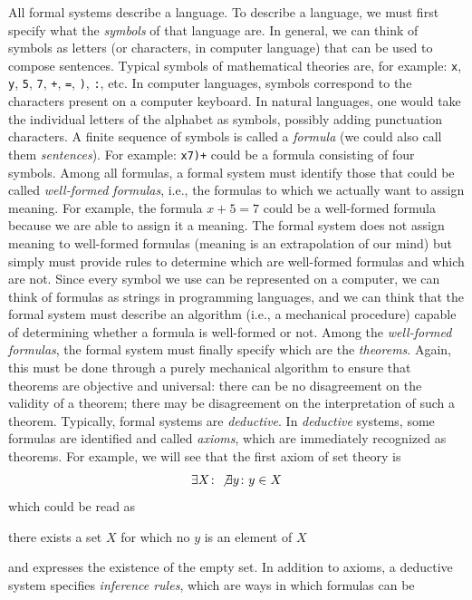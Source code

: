 All formal systems describe a language. To describe a language, we must first
specify what the \emph{symbols}%
%
 of that language are. In general, we can think of symbols as letters (or characters, in computer language) that can be used to compose sentences. Typical symbols of mathematical theories are, for example: \texttt{x}, \texttt{y}, \texttt{5}, \texttt{7}, \texttt{+}, \texttt{=}, \texttt{)}, \texttt{:}, etc. In computer languages, symbols correspond to the characters present on a computer keyboard. In natural languages, one would take the individual letters of the alphabet as symbols, possibly adding punctuation characters. A finite sequence of symbols is called a \emph{formula}%
%
 (we could also call them \emph{sentences}). For example: \texttt{x7)+} could be a formula consisting of four symbols. Among all formulas, a formal system must identify those that could be called \emph{well-formed formulas}, i.e., the formulas to which we actually want to assign meaning. For example, the formula $x+5=7$ could be a well-formed formula because we are able to assign it a meaning. The formal system does not assign meaning to well-formed formulas (meaning is an extrapolation of our mind) but simply must provide rules to determine which are well-formed formulas and which are not. Since every symbol we use can be represented on a computer, we can think of formulas as strings in programming languages, and we can think that the formal system must describe an algorithm (i.e., a mechanical procedure) capable of determining whether a formula is well-formed or not. Among the \emph{well-formed formulas}, the formal system must finally specify which are the \emph{theorems}. Again, this must be done through a purely mechanical algorithm to ensure that theorems are objective and universal: there can be no disagreement on the validity of a theorem; there may be disagreement on the interpretation of such a theorem. Typically, formal systems are \emph{deductive}. In \emph{deductive} systems, some formulas are identified and called \emph{axioms}, which are immediately recognized as theorems. For example, we will see that the first axiom of set theory is 
\[
  \exists X\colon \not \exists y\colon y\in X
\]
which could be read as 
\begin{displayquote}
there exists a set $X$ for which no $y$ is an element of $X$
\end{displayquote}
and expresses the existence of the empty set. In addition to axioms, a deductive
system specifies \emph{inference rules}, which are ways in which formulas can be
